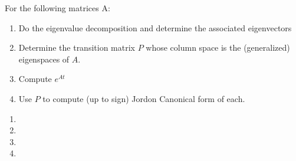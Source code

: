 For the following matrices A:
\begin{enumerate}[label=(\alph*)]
    \item Do the eigenvalue decomposition and determine the associated eigenvectors
    \item Determine the transition matrix $P$ whose column space is the (generalized) eigenspaces of $A$.
    \item Compute $e^{At}$
    \item Use $P$ to compute (up to sign) Jordon Canonical form of each.
\end{enumerate}
\begin{enumerate}[label=\Alph*.]
    \item \newpage
    \item \newpage
    \item \newpage
    \item 
\end{enumerate}